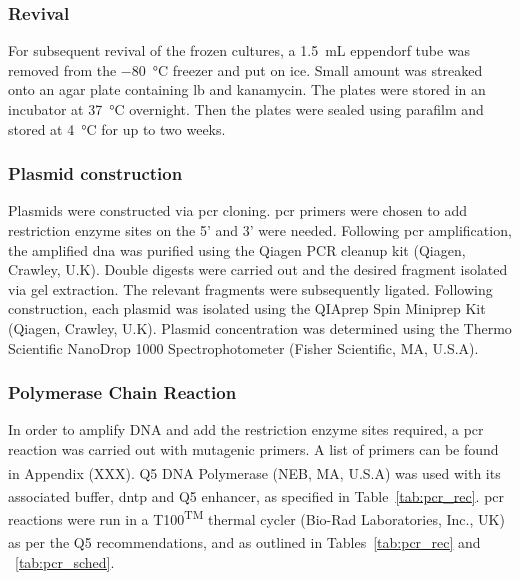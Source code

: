 \subsubsection{Revival}
For subsequent revival of the frozen cultures, a \SI{1.5}{\milli\liter} eppendorf tube was removed from the \SI{-80}{\celsius} freezer and put on ice. Small amount was streaked onto an agar plate containing \acrshort{lb} and kanamycin. The plates were stored in an incubator at \SI{37}{\celsius} overnight. Then the plates were sealed using parafilm and stored at \SI{4}{\celsius} for up to two weeks. 



\subsubsection{Plasmid construction}

Plasmids were constructed via \acrshort{pcr} cloning. \acrshort{pcr} primers were chosen to add restriction enzyme sites on the 5' and 3' were needed. Following \acrshort{pcr} amplification, the amplified \acrshort{dna} was purified using the Qiagen PCR cleanup kit (Qiagen, Crawley, U.K). Double digests were carried out and the desired fragment isolated via gel extraction. The relevant fragments were subsequently ligated. Following construction, each plasmid was isolated using the QIAprep Spin Miniprep Kit (Qiagen, Crawley, U.K). Plasmid concentration was determined using the Thermo Scientific NanoDrop 1000 Spectrophotometer (Fisher Scientific, MA, U.S.A).

\subsubsection{Polymerase Chain Reaction}
\label{sec:pcr}
In order to amplify DNA and add the restriction enzyme sites required, a \acrfull{pcr} reaction was carried out with mutagenic primers. A list of primers can be found in Appendix (XXX). Q5\textsuperscript{\textregistered} DNA Polymerase (NEB, MA, U.S.A) was used with its associated buffer, \acrshort{dntp} and Q5\textsuperscript{\textregistered} enhancer, as specified in Table~\ref{tab:pcr_rec}. \acrshort{pcr} reactions were run in a T100\textsuperscript{TM} thermal cycler (Bio-Rad Laboratories, Inc., UK) as per the Q5\textsuperscript{\textregistered} recommendations, and as outlined in Tables~\ref{tab:pcr_rec} and ~\ref{tab:pcr_sched}.

